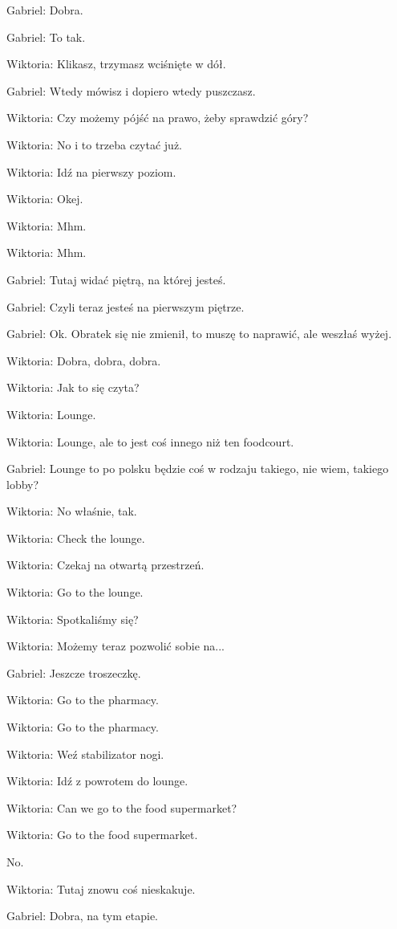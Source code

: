 Gabriel: Dobra.

Gabriel: To tak.

Wiktoria: Klikasz, trzymasz wciśnięte w dół.

Gabriel: Wtedy mówisz i dopiero wtedy puszczasz.

Wiktoria: Czy możemy pójść na prawo, żeby sprawdzić góry?

Wiktoria: No i to trzeba czytać już.

Wiktoria: Idź na pierwszy poziom.

Wiktoria: Okej.

Wiktoria: Mhm.

Wiktoria: Mhm.

Gabriel: Tutaj widać piętrą, na której jesteś.

Gabriel: Czyli teraz jesteś na pierwszym piętrze.

Gabriel: Ok. Obratek się nie zmienił, to muszę to naprawić, ale weszłaś wyżej.

Wiktoria: Dobra, dobra, dobra.

Wiktoria: Jak to się czyta?

Wiktoria: Lounge.

Wiktoria: Lounge, ale to jest coś innego niż ten foodcourt.

Gabriel: Lounge to po polsku będzie coś w rodzaju takiego, nie wiem, takiego lobby?

Wiktoria: No właśnie, tak.

Wiktoria: Check the lounge.

Wiktoria: Czekaj na otwartą przestrzeń.

Wiktoria: Go to the lounge.

Wiktoria: Spotkaliśmy się?

Wiktoria: Możemy teraz pozwolić sobie na...

Gabriel: Jeszcze troszeczkę.

Wiktoria: Go to the pharmacy.

Wiktoria: Go to the pharmacy.

Wiktoria: Weź stabilizator nogi.

Wiktoria: Idź z powrotem do lounge.

Wiktoria: Can we go to the food supermarket?

Wiktoria: Go to the food supermarket.

No.

Wiktoria: Tutaj znowu coś nieskakuje.

Gabriel: Dobra, na tym etapie.

